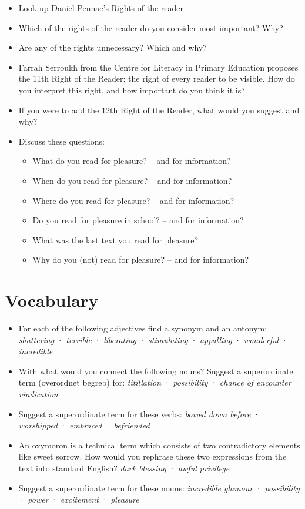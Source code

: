 \documentclass[11pt,a4paper,oneside]{book}
\begin{document}
\begin{itemize}
\item Look up Daniel Pennac's Rights of the reader
\item Which of the rights of the reader do you consider most important? Why?
\item Are any of the rights unnecessary? Which and why?
\item Farrah Serroukh from the Centre for Literacy in Primary Education proposes the 11th Right of the Reader: the right of every reader to be visible. How do you interpret this right, and how important do you think it is?
\item If you were to add the 12th Right of the Reader, what would you suggest and why?
\item Discuss these questions:

\begin{itemize}
\item What do you read for pleasure? – and for information?
\item When do you read for pleasure? – and for information?
\item Where do you read for pleasure? – and for information?
\item Do you read for pleasure in school? – and for information?
\item What was the last text you read for pleasure?
\item Why do you (not) read for pleasure? – and for information?
\end{itemize}

\end{itemize}

\section*{Vocabulary}

\begin{itemize}
\item For each of the following adjectives find a synonym and an antonym: \emph{shattering} · \emph{terrible} · \emph{liberating} · \emph{stimulating} · \emph{appalling} · \emph{wonderful} · \emph{incredible}
\item With what would you connect the following nouns? Suggest a superordinate term (overordnet begreb) for: \emph{titillation} · \emph{possibility} · \emph{chance of encounter} · \emph{vindication}
\item Suggest a superordinate term for these verbs: \emph{bowed down before} · \emph{worshipped} · \emph{embraced} · \emph{befriended}
\item An oxymoron is a technical term which consists of two contradictory elements like sweet sorrow. How would you rephrase these two expressions from the text into standard English? \emph{dark blessing} · \emph{awful privilege}
\item Suggest a superordinate term for these nouns: \emph{incredible glamour} · \emph{possibility} · \emph{power} · \emph{excitement} · \emph{pleasure}
\end{itemize}
\end{document}
